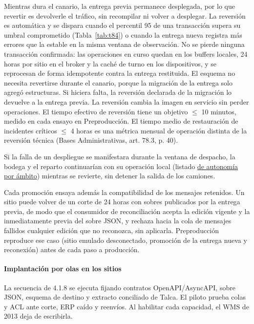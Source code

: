 Mientras dura el canario, la entrega previa permanece desplegada, por lo que revertir es devolverle el tráfico, sin recompilar ni volver a desplegar. La reversión es automática y se dispara cuando el percentil 95 de una transacción supera su umbral comprometido (Tabla~\ref{tab:t84}) o cuando la entrega nueva registra más errores que la estable en la misma ventana de observación. No se pierde ninguna transacción confirmada: las operaciones en curso quedan en los buffers locales, 24 horas por sitio en el broker y la caché de turno en los dispositivos, y se reprocesan de forma idempotente contra la entrega restituida. El esquema no necesita revertirse durante el canario, porque la migración de la entrega solo agregó estructuras. Si hiciera falta, la reversión declarada de la migración lo devuelve a la entrega previa. La reversión cambia la imagen en servicio sin perder operaciones. El tiempo efectivo de reversión tiene un objetivo $\leq$ 10 minutos, medido en cada ensayo en Preproducción. El tiempo medio de restauración de incidentes críticos $\leq$ 4 horas es una métrica mensual de operación distinta de la reversión técnica (Bases Administrativas, art. 78.3, p. 40).

Si la falla de un despliegue se manifestara durante la ventana de despacho, la bodega y el reparto continuarían con su operación local (listado \hyperref[tab:t29]{de autonomía por ámbito}) mientras se revierte, sin detener la salida de los camiones.

Cada promoción ensaya además la compatibilidad de los mensajes retenidos. Un sitio puede volver de un corte de 24 horas con sobres publicados por la entrega previa, de modo que el consumidor de reconciliación acepta la edición vigente y la inmediatamente previa del sobre JSON, y rechaza hacia la cola de mensajes fallidos cualquier edición que no reconozca, sin aplicarla. Preproducción reproduce ese caso (sitio emulado desconectado, promoción de la entrega nueva y reconexión) antes de cada paso a producción.

\paragraph{Implantación por olas en los sitios}

La secuencia de 4.1.8 se ejecuta fijando contratos OpenAPI/AsyncAPI, sobre JSON, esquema de destino y extracto conciliado de Talca. El piloto prueba colas y ACL ante corte, ERP caído y reenvíos. Al habilitar cada capacidad, el WMS de 2013 deja de escribirla.

